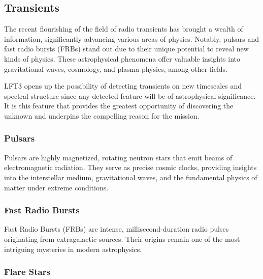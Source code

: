 \subsection{Transients}
The recent flourishing of the field of radio transients has brought a wealth of information, significantly advancing various areas of physics. Notably, pulsars and fast radio bursts (FRBs) stand out due to their unique potential to reveal new kinds of physics. These astrophysical phenomena offer valuable insights into gravitational waves, cosmology, and plasma physics, among other fields.

LFT3 opens up the possibility of detecting transients on new timescales and spectral structure since any detected feature will be of astrophysical significance.  It is this feature that provides the greatest opportunity of discovering the unknown and underpins the compelling reason for the mission.

\subsubsection{Pulsars}
Pulsars are highly magnetized, rotating neutron stars that emit beams of electromagnetic radiation. They serve as precise cosmic clocks, providing insights into the interstellar medium, gravitational waves, and the fundamental physics of matter under extreme conditions. %

\subsubsection{Fast Radio Bursts}
Fast Radio Bursts (FRBs) are intense, millisecond-duration radio pulses originating from extragalactic sources. Their origins remain one of the most intriguing mysteries in modern astrophysics. %

\subsubsection{Flare Stars}

